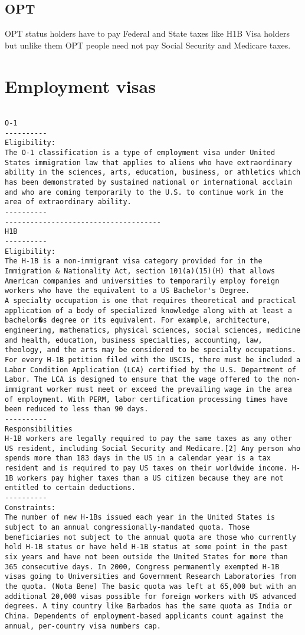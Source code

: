 \documentclass[oneside, article]{memoir}
\begin{document}
\subsection{OPT}
OPT status holders have to pay Federal and State taxes like H1B Visa holders but unlike them OPT people need not pay Social Security and Medicare taxes.

\section{Employment visas}
\begin{verbatim}

O-1
----------
Eligibility:
The O-1 classification is a type of employment visa under United States immigration law that applies to aliens who have extraordinary ability in the sciences, arts, education, business, or athletics which has been demonstrated by sustained national or international acclaim and who are coming temporarily to the U.S. to continue work in the area of extraordinary ability.
----------
-------------------------------------
H1B
----------
Eligibility:
The H-1B is a non-immigrant visa category provided for in the Immigration & Nationality Act, section 101(a)(15)(H) that allows American companies and universities to temporarily employ foreign workers who have the equivalent to a US Bachelor's Degree.
A specialty occupation is one that requires theoretical and practical application of a body of specialized knowledge along with at least a bachelor�s degree or its equivalent. For example, architecture, engineering, mathematics, physical sciences, social sciences, medicine and health, education, business specialties, accounting, law, theology, and the arts may be considered to be specialty occupations.
For every H-1B petition filed with the USCIS, there must be included a Labor Condition Application (LCA) certified by the U.S. Department of Labor. The LCA is designed to ensure that the wage offered to the non-immigrant worker must meet or exceed the prevailing wage in the area of employment. With PERM, labor certification processing times have been reduced to less than 90 days.
----------
Responsibilities
H-1B workers are legally required to pay the same taxes as any other US resident, including Social Security and Medicare.[2] Any person who spends more than 183 days in the US in a calendar year is a tax resident and is required to pay US taxes on their worldwide income. H-1B workers pay higher taxes than a US citizen because they are not entitled to certain deductions.
----------
Constraints:
The number of new H-1Bs issued each year in the United States is subject to an annual congressionally-mandated quota. Those beneficiaries not subject to the annual quota are those who currently hold H-1B status or have held H-1B status at some point in the past six years and have not been outside the United States for more than 365 consecutive days. In 2000, Congress permanently exempted H-1B visas going to Universities and Government Research Laboratories from the quota. (Nota Bene) The basic quota was left at 65,000 but with an additional 20,000 visas possible for foreign workers with US advanced degrees. A tiny country like Barbados has the same quota as India or China. Dependents of employment-based applicants count against the annual, per-country visa numbers cap.

\end{verbatim}
\end{document}
